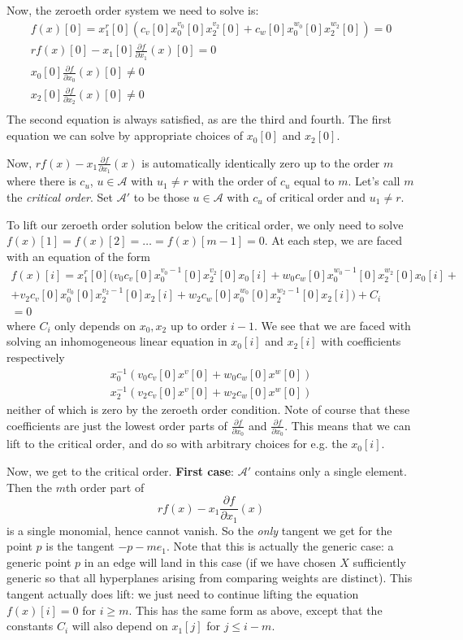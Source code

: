 \documentclass[oneside]{amsart}
\newcommand{\A}{\mathcal{A}}
\theoremstyle{definition}
\begin{document}
Now, the zeroeth order system we need to solve is:
\begin{align*}
	f(x)[0]=x_1^r[0]\left(c_v[0]x_0^{v_0}[0]x_2^{v_2}[0]+c_w[0]x_0^{w_0}[0]x_2^{w_2}[0]\right)=0\\
	rf(x)[0]-x_1[0]\frac{\partial f}{\partial x_1}(x)[0]=0\\
	x_0[0]\frac{\partial f}{\partial x_0}(x)[0]\neq 0\\
	x_2[0]\frac{\partial f}{\partial x_2}(x)[0]\neq 0\\
\end{align*}
The second equation is always satisfied, as are the third and fourth. The first equation we can solve by appropriate choices of $x_0[0]$ and $x_2[0]$.

Now, $rf(x)-x_1\frac{\partial f}{\partial x_1}(x)$ is automatically identically zero up to the order $m$ where there is $c_u$, $u\in \A$ with $u_1\neq r$ with the order of $c_u$ equal to $m$. Let's call $m$ the \emph{critical order}. Set $\A'$ to be those $u\in \A$ with $c_u$ of critical order and $u_1\neq r$.

To lift our zeroeth order solution below the critical order, we only need to solve $f(x)[1]=f(x)[2]=\ldots=f(x)[m-1]=0$. At each step, we are faced with an equation of the form 
\begin{align*}
	f(x)[i]=x_1^r[0](v_0c_v[0]x_0^{v_0-1}[0]x_2^{v_2}[0]x_0[i]+w_0c_w[0]x_0^{w_0-1}[0]x_2^{w_2}[0]x_0[i]+\\
+v_2c_v[0]x_0^{v_0}[0]x_2^{v_2-1}[0]x_2[i]+w_2c_w[0]x_0^{w_0}[0]x_2^{w_2-1}[0]x_2[i])+C_i\\
=0
\end{align*}
where $C_i$ only depends on $x_0,x_2$ up to order $i-1$. We see that we are faced with solving an inhomogeneous linear equation in $x_0[i]$ and $x_2[i]$ with coefficients respectively 
\begin{align*}
	x_0^{-1}(v_0c_v[0]x^v[0]+w_0c_w[0]x^{w}[0])\\
	x_2^{-1}(v_2c_v[0]x^v[0]+w_2c_w[0]x^{w}[0])
\end{align*}
neither of which is zero by the zeroeth order condition. Note of course that these coefficients are just the lowest order parts of $\frac{\partial{f}}{\partial x_0}$ and $\frac{\partial{f}}{\partial x_0}$.
This means that we can lift to the critical order, and do so with arbitrary choices for e.g. the $x_0[i]$.

Now, we get to the critical order. {\bf First case}: $\A'$ contains only a single element. Then the $m$th order part of 
\[rf(x)-x_1\frac{\partial f}{\partial x_1}(x)\]
is a single monomial, hence cannot vanish. So the \emph{only} tangent we get for the point $p$ is the tangent $-p-me_1$. Note that this is actually the generic case: a generic point $p$ in an edge will land in this case (if we have chosen $X$ sufficiently generic so that all hyperplanes arising from comparing weights are distinct). This tangent actually does lift: we just need to continue lifting the equation $f(x)[i]=0$ for $i\geq m$. This has the same form as above, except that the constants $C_i$ will also depend on $x_1[j]$ for $j\leq i-m$.
\end{document}
